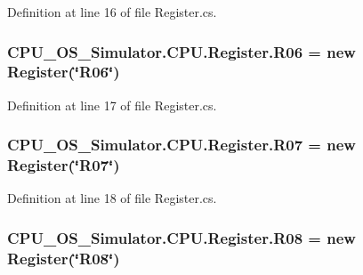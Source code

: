 Definition at line 16 of file Register.\+cs.

\hypertarget{class_c_p_u___o_s___simulator_1_1_c_p_u_1_1_register_a643141b987101b5bc93f99d04faecca8}{}
\subsubsection[{R06}]{ C\+P\+U\+\_\+\+O\+S\+\_\+\+Simulator.\+C\+P\+U.\+Register.\+R06 = new {\bf Register}(\char`\"{}R06\char`\"{})\hspace{0.3cm}{\ttfamily [static]}}\label{class_c_p_u___o_s___simulator_1_1_c_p_u_1_1_register_a643141b987101b5bc93f99d04faecca8}


Definition at line 17 of file Register.\+cs.

\hypertarget{class_c_p_u___o_s___simulator_1_1_c_p_u_1_1_register_a2224ffa8d2250d999afcddf739b5762b}{}
\subsubsection[{R07}]{ C\+P\+U\+\_\+\+O\+S\+\_\+\+Simulator.\+C\+P\+U.\+Register.\+R07 = new {\bf Register}(\char`\"{}R07\char`\"{})\hspace{0.3cm}{\ttfamily [static]}}\label{class_c_p_u___o_s___simulator_1_1_c_p_u_1_1_register_a2224ffa8d2250d999afcddf739b5762b}


Definition at line 18 of file Register.\+cs.

\hypertarget{class_c_p_u___o_s___simulator_1_1_c_p_u_1_1_register_a782cd395e24947e6bb509cbf61d090e2}{}
\subsubsection[{R08}]{ C\+P\+U\+\_\+\+O\+S\+\_\+\+Simulator.\+C\+P\+U.\+Register.\+R08 = new {\bf Register}(\char`\"{}R08\char`\"{})\hspace{0.3cm}{\ttfamily [static]}}\label{class_c_p_u___o_s___simulator_1_1_c_p_u_1_1_register_a782cd395e24947e6bb509cbf61d090e2}


